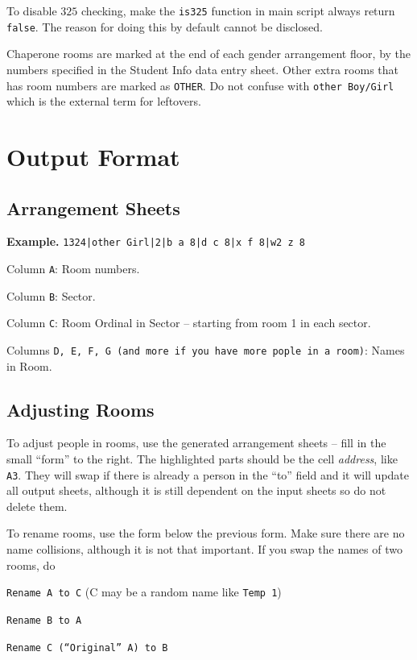 \documentclass[openany,notitlepage]{book}
\begin{document}
	To disable $325$ checking, make the \verb|is325| function in main script always return \verb|false|. The reason for doing this by default cannot be disclosed.
	
	Chaperone rooms are marked at the end of each gender arrangement floor, by the numbers specified in the Student
	Info data entry sheet. Other extra rooms that has room numbers are marked as \verb|OTHER|. Do not confuse with \verb|other Boy/Girl| which 
	is the external term for leftovers.
	
	\section{Output Format}
	\subsection{Arrangement Sheets}
	\textbf{Example.} \texttt{1324|other Girl|2|b a 8|d c 8|x f 8|w2 z 8}
	
	Column \verb|A|: Room numbers.
	
	Column \verb|B|: Sector.
	
	Column \verb|C|: Room Ordinal in Sector -- starting from room 1 in each sector. 
	
	Columns \verb|D, E, F, G (and more if you have more pople in a room)|: Names in Room.
	
	\subsection{Adjusting Rooms}
	
	To adjust people in rooms, use the generated arrangement sheets  -- fill in the small ``form'' to the right. The highlighted
	parts should be the cell \emph{address}, like \verb|A3|. They will swap if there is already a person in the ``to'' field and it
	will update all output sheets, although it is still dependent on the input sheets so do not delete them.
	
	To rename rooms, use the form below the previous form. Make sure there are no name collisions, although it is not that
	important. If you swap the names of two rooms, do
	\begin{center}
		\texttt{Rename A to C} (C may be a random name like \texttt{Temp 1})
		
		\texttt{Rename B to A}
		
		\texttt{Rename C (``Original'' A) to B}
	\end{center}
	
\end{document}
